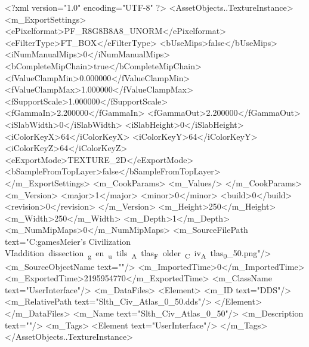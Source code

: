 <?xml version="1.0" encoding="UTF-8" ?>
<AssetObjects..TextureInstance>
	<m_ExportSettings>
		<ePixelformat>PF_R8G8B8A8_UNORM</ePixelformat>
		<eFilterType>FT_BOX</eFilterType>
		<bUseMips>false</bUseMips>
		<iNumManualMips>0</iNumManualMips>
		<bCompleteMipChain>true</bCompleteMipChain>
		<fValueClampMin>0.000000</fValueClampMin>
		<fValueClampMax>1.000000</fValueClampMax>
		<fSupportScale>1.000000</fSupportScale>
		<fGammaIn>2.200000</fGammaIn>
		<fGammaOut>2.200000</fGammaOut>
		<iSlabWidth>0</iSlabWidth>
		<iSlabHeight>0</iSlabHeight>
		<iColorKeyX>64</iColorKeyX>
		<iColorKeyY>64</iColorKeyY>
		<iColorKeyZ>64</iColorKeyZ>
		<eExportMode>TEXTURE_2D</eExportMode>
		<bSampleFromTopLayer>false</bSampleFromTopLayer>
	</m_ExportSettings>
	<m_CookParams>
		<m_Values/>
	</m_CookParams>
	<m_Version>
		<major>1</major>
		<minor>0</minor>
		<build>0</build>
		<revision>0</revision>
	</m_Version>
	<m_Height>250</m_Height>
	<m_Width>250</m_Width>
	<m_Depth>1</m_Depth>
	<m_NumMipMaps>0</m_NumMipMaps>
	<m_SourceFilePath text="C:\Users\Sam\Documents\my games\Sid Meier's Civilization VI\Mods\unit addition dissection\python_gen\build_utils\CIV_Atlas_Folder\Slth_Civ_Atlas_0_50.png"/>
	<m_SourceObjectName text=""/>
	<m_ImportedTime>0</m_ImportedTime>
	<m_ExportedTime>2195954770</m_ExportedTime>
	<m_ClassName text="UserInterface"/>
	<m_DataFiles>
		<Element>
			<m_ID text="DDS"/>
			<m_RelativePath text="Slth_Civ_Atlas_0_50.dds"/>
		</Element>
	</m_DataFiles>
	<m_Name text="Slth_Civ_Atlas_0_50"/>
	<m_Description text=""/>
	<m_Tags>
		<Element text="UserInterface"/>
	</m_Tags>
</AssetObjects..TextureInstance>

